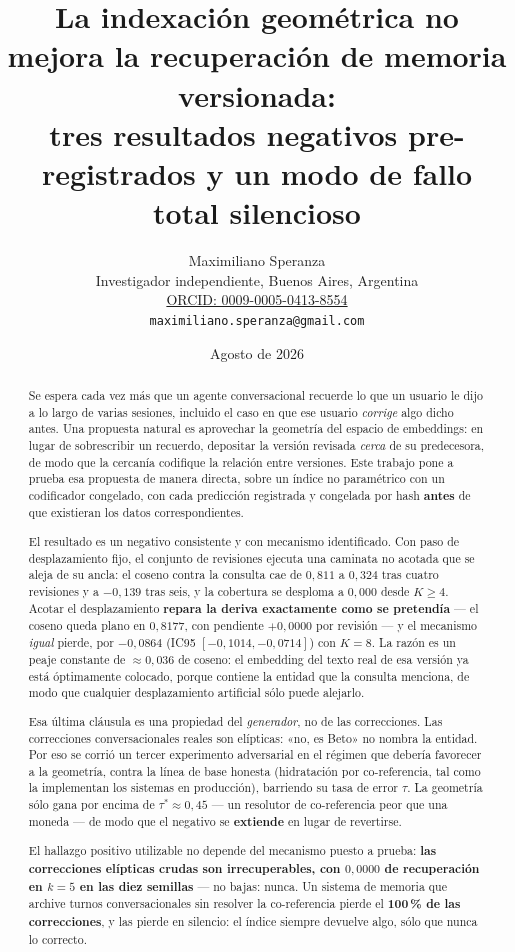 \documentclass[11pt,a4paper]{article}
\title{\bfseries La indexación geométrica no mejora la recuperación de memoria versionada:\\
tres resultados negativos pre-registrados y un modo de fallo total silencioso}
\author{Maximiliano Speranza\\
\small Investigador independiente, Buenos Aires, Argentina\\
\small \href{https://orcid.org/0009-0005-0413-8554}{ORCID: 0009-0005-0413-8554}\\
\small \texttt{maximiliano.speranza@gmail.com}}
\date{Agosto de 2026}
\begin{document}
\maketitle

\begin{abstract}
\noindent
Se espera cada vez más que un agente conversacional recuerde lo que un usuario le dijo a lo largo de
varias sesiones, incluido el caso en que ese usuario \emph{corrige} algo dicho antes. Una propuesta
natural es aprovechar la geometría del espacio de embeddings: en lugar de sobrescribir un recuerdo,
depositar la versión revisada \emph{cerca} de su predecesora, de modo que la cercanía codifique la
relación entre versiones. Este trabajo pone a prueba esa propuesta de manera directa, sobre un índice
no paramétrico con un codificador congelado, con cada predicción registrada y congelada por hash
\textbf{antes} de que existieran los datos correspondientes.

El resultado es un negativo consistente y con mecanismo identificado. Con paso de desplazamiento
fijo, el conjunto de revisiones ejecuta una caminata no acotada que se aleja de su ancla: el coseno
contra la consulta cae de $0{,}811$ a $0{,}324$ tras cuatro revisiones y a $-0{,}139$ tras seis, y la
cobertura se desploma a $0{,}000$ desde $K \geq 4$. Acotar el desplazamiento \textbf{repara la deriva
exactamente como se pretendía} --- el coseno queda plano en $0{,}8177$, con pendiente $+0{,}0000$ por
revisión --- y el mecanismo \emph{igual} pierde, por $-0{,}0864$ (IC95 $[-0{,}1014, -0{,}0714]$) con
$K=8$. La razón es un peaje constante de $\approx 0{,}036$ de coseno: el embedding del texto real de
esa versión ya está óptimamente colocado, porque contiene la entidad que la consulta menciona, de modo
que cualquier desplazamiento artificial sólo puede alejarlo.

Esa última cláusula es una propiedad del \emph{generador}, no de las correcciones. Las correcciones
conversacionales reales son elípticas: «no, es Beto» no nombra la entidad. Por eso se corrió un tercer
experimento adversarial en el régimen que debería favorecer a la geometría, contra la línea de base
honesta (hidratación por co-referencia, tal como la implementan los sistemas en producción), barriendo
su tasa de error $\tau$. La geometría sólo gana por encima de $\tau^{*} \approx 0{,}45$ --- un
resolutor de co-referencia peor que una moneda --- de modo que el negativo se \textbf{extiende} en
lugar de revertirse.

El hallazgo positivo utilizable no depende del mecanismo puesto a prueba: \textbf{las correcciones
elípticas crudas son irrecuperables, con $0{,}0000$ de recuperación en $k=5$ en las diez semillas} ---
no bajas: nunca. Un sistema de memoria que archive turnos conversacionales sin resolver la
co-referencia pierde el \textbf{100\,\% de las correcciones}, y las pierde en silencio: el índice
siempre devuelve algo, sólo que nunca lo correcto.


\end{abstract}
\end{document}

